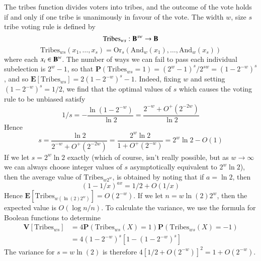 \begin{example}
    The tribes function divides voters into tribes, and the outcome of the vote holds if and only if one tribe is unanimously in favour of the vote. The width $w$, size $s$ tribe voting rule is defined by
    \[ \text{Tribes}_{ws}: \operatorname{\mathbf{B}}^{sw} \to \operatorname{\mathbf{B}} \]
    \[ \text{Tribes}_{ws}(x_1, \dots, x_s) = \text{Or}_s(\text{And}_w(x_1), \dots, \text{And}_w(x_s)) \]
    where each $x_i \in \operatorname{\mathbf{B}}^w$. The number of ways we can fail to pass each individual subelection is $2^w - 1$, so that $\mathbf{P}(\text{Tribes}_{ws} = 1) = (2^w - 1)^s/2^{sw} = (1 - 2^{-w})^s$, and so $\mathbf{E}[\text{Tribes}_{ws}] = 2(1 - 2^{-w})^s - 1$. Indeed, fixing $w$ and setting $(1 - 2^{-w})^s = 1/2$, we find that the optimal values of $s$ which causes the voting rule to be unbiased satisfy
    \[ 1/s = - \frac{\ln(1 - 2^{-w})}{\ln 2} = \frac{2^{-w} + O^+(2^{-2w})}{\ln 2} \]
    Hence
    \[ s = \frac{\ln 2}{2^{-w} + O^+(2^{-2w})} = \frac{2^w \ln 2}{1 + O^+(2^{-w})} = 2^w \ln 2 - O(1) \]
    If we let $s = 2^w \ln 2$ exactly (which of course, isn't really possible, but as $w \to \infty$ we can always choose integer values of $s$ asymptotically equivalent to $2^w \ln 2$), then the average value of $\text{Tribes}_{w2^w}$, is obtained by noting that if $a = \ln 2$, then
    \[ (1 - 1/x)^{ax} = 1/2 + O(1/x) \]
    Hence $\mathbf{E}[\text{Tribes}_{w(\ln(2) 2^w)}] = O(2^{-w})$. If we let $n = w \ln(2) 2^w$, then the expected value is $O(\log n/n)$. To calculate the variance, we use the formula for Boolean functions to determine
    \begin{align*}
        \mathbf{V}[\text{Tribes}_{ws}] &= 4\mathbf{P}(\text{Tribes}_{ws}(X) = 1) \mathbf{P}(\text{Tribes}_{ws}(X) = -1)\\
        &= 4(1 - 2^{-w})^s[1 - (1 - 2^{-w})^{s}]
    \end{align*}
    The variance for $s = w \ln(2)$ is therefore $4[1/2 + O(2^{-w})]^2 = 1 + O(2^{-w})$.
\end{example}

